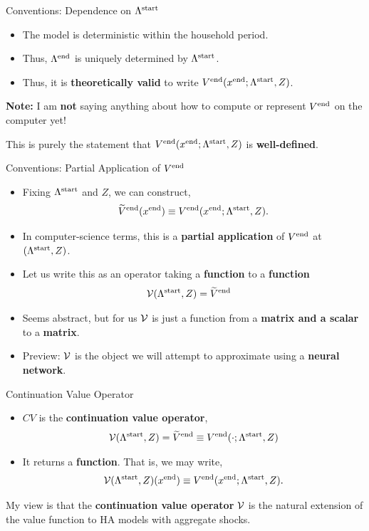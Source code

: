 \documentclass[10pt,aspectratio=169]{beamer}
\begin{document}
\begin{frame}{Conventions: Dependence on $\Lambda^{\mathrm{start}}$}
  \begin{itemize}
    \item The model is deterministic within the household period.
    \item Thus, $\Lambda^{\mathrm{end}}$ is uniquely determined by $\Lambda^{\mathrm{start}}$.
    \item Thus, it is \textbf{theoretically valid} to write $V^{\mathrm{end}}(x^{\mathrm{end}}; \Lambda^{\mathrm{start}}, Z)$.
  \end{itemize}
  \textbf{Note:} I am \textbf{not} saying anything about how to compute or represent $V^{\mathrm{end}}$ on the computer yet!

  This is purely the statement that $V^{\mathrm{end}}(x^{\mathrm{end}}; \Lambda^{\mathrm{start}}, Z)$ is \textbf{well-defined}.
\end{frame}

\begin{frame}{Conventions: Partial Application of $V^{\mathrm{end}}$}
  \begin{itemize}
    \item Fixing $\Lambda^{\mathrm{start}}$ and $Z$, we can construct,
    \[
      \widetilde{V}^{\mathrm{end}}(x^{\mathrm{end}}) \equiv V^{\mathrm{end}}(x^{\mathrm{end}}; \Lambda^{\mathrm{start}}, Z).
    \]
    \item In computer-science terms, this is a \textbf{partial application} of $V^{\mathrm{end}}$ at $(\Lambda^{\mathrm{start}}, Z)$.
    \item Let us write this as an operator taking a \textbf{function} to a \textbf{function}
    \begin{align*}
      &\mathcal{V}(\Lambda^{\mathrm{start}}, Z) = \widetilde{V}^{\mathrm{end}}
    \end{align*}
    \item Seems abstract, but for us $\mathcal{V}$ is just a function from a \textbf{matrix and a scalar} to a \textbf{matrix}.
    \item Preview: $\mathcal{V}$ is the object we will attempt to approximate using a \textbf{neural network}.
  \end{itemize}
\end{frame}

\begin{frame}{Continuation Value Operator}
  \begin{itemize}
    \item $CV$ is the \textbf{continuation value operator},
    \begin{align*}
      &\mathcal{V}(\Lambda^{\mathrm{start}}, Z) = \widetilde{V}^{\mathrm{end}} \equiv V^{\mathrm{end}}(\cdot; \Lambda^{\mathrm{start}}, Z)\\
    \end{align*}
    \item It returns a \textbf{function}. That is, we may write,
    \[
      \mathcal{V}(\Lambda^{\mathrm{start}}, Z)(x^{\mathrm{end}}) \equiv V^{\mathrm{end}}(x^{\mathrm{end}}; \Lambda^{\mathrm{start}}, Z).
    \]
  \end{itemize}
  My view is that the \textbf{continuation value operator} $\mathcal{V}$ is the natural extension of the value function to HA models with aggregate shocks.
\end{frame}
\end{document}
